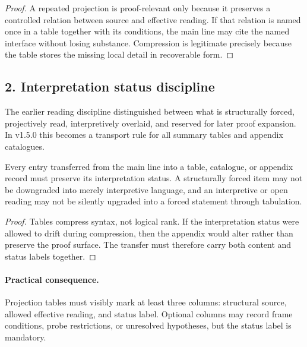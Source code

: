 \begin{proof}
A repeated projection is proof-relevant only because it preserves a controlled
relation between source and effective reading. If that relation is named once in
a table together with its conditions, the main line may cite the named interface
without losing substance. Compression is legitimate precisely because the table
stores the missing local detail in recoverable form.
\end{proof}

\subsection*{2. Interpretation status discipline}
The earlier reading discipline distinguished between what is structurally
forced, projectively read, interpretively overlaid, and reserved for later proof expansion. In
v1.5.0 this becomes a transport rule for all summary tables and appendix
catalogues.

\begin{proposition}
\label{prop:interpretation-status-transport}
Every entry transferred from the main line into a table, catalogue, or appendix
record must preserve its interpretation status. A structurally forced item may
not be downgraded into merely interpretive language, and an interpretive or open reading may not
be silently upgraded into a forced statement through tabulation.
\end{proposition}

\begin{proof}
Tables compress syntax, not logical rank. If the interpretation status were
allowed to drift during compression, then the appendix would alter rather than
preserve the proof surface. The transfer must therefore carry both content and
status labels together.
\end{proof}

\paragraph{Practical consequence.}
Projection tables must visibly mark at least three columns: structural source,
allowed effective reading, and status label. Optional columns may record frame
conditions, probe restrictions, or unresolved hypotheses, but the status label
is mandatory.

